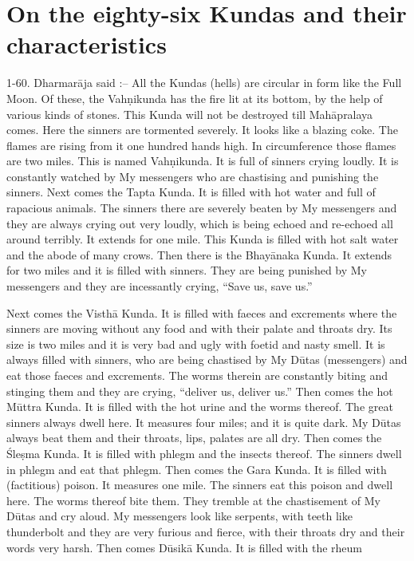 \chapter{On the eighty-six Kundas and their characteristics}

1-60. Dharmar\=aja said :-- All the Kundas (hells) are circular in form like the Full Moon. Of these, the Vah\d{n}ikunda has the fire lit at its bottom, by the help of various kinds of stones. This Kunda will not be destroyed till Mah\=apralaya comes. Here the sinners are tormented severely. It looks like a blazing coke. The flames are rising from it one hundred hands high. In circumference those flames are two miles. This is named Vah\d{n}ikunda. It is full of sinners crying loudly. It is constantly watched by My messengers who are chastising and punishing the sinners. Next comes the Tapta Kunda. It is filled with hot water and full of rapacious animals. The sinners there are severely beaten by My messengers and they are always crying out very loudly, which is being echoed and re-echoed all around terribly. It extends for one mile. This Kunda is filled with hot salt water and the abode of many crows. Then there is the Bhay\=anaka Kunda. It extends for two miles and it is filled with sinners. They are being punished by My messengers and they are incessantly crying, ``Save us, save us.''

Next comes the Visth\=a Kunda. It is filled with faeces and excrements where the sinners are moving without any food and with their palate and throats dry. Its size is two miles and it is very bad and ugly with foetid and nasty smell. It is always filled with sinners, who are being chastised by My D\=utas (messengers) and eat those faeces and excrements. The worms therein are constantly biting and stinging them and they are crying, ``deliver us, deliver us.'' Then comes the hot M\=uttra Kunda. It is filled with the hot urine and the worms thereof. The great sinners always dwell here. It measures four miles; and it is quite dark. My D\=utas always beat them and their throats, lips, palates are all dry. Then comes the \'Sle\d{s}ma Kunda. It is filled with phlegm and the insects thereof. The sinners dwell in phlegm and eat that phlegm. Then comes the Gara Kunda. It is filled with (factitious) poison. It measures one mile. The sinners eat this poison and dwell here. The worms thereof bite them. They tremble at the chastisement of My D\=utas and cry aloud. My messengers look like serpents, with teeth like thunderbolt and they are very furious and fierce, with their throats dry and their words very harsh. Then comes D\=usik\=a Kunda. It is filled with the rheum

